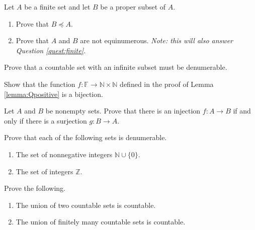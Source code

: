 \begin{exercise}\label{ex:finite}
Let $A$ be a finite set and let $B$ be a proper subset of $A$.
\begin{enumerate}
\item Prove that $B\preceq A$.
\item Prove that $A$ and $B$ are not equinumerous.  {\slshape Note: this will also answer Question \ref{quest:finite}.}
\end{enumerate}
\end{exercise}

\begin{exercise}\label{exer:countinf}\markit
Prove that a countable set with an infinite subset must be denumerable.
\end{exercise}

\begin{exercise}\label{exer:Qpositive}
Show that the function $f:\mathbb F\to \mathbb N\times\mathbb N$ defined in the proof of Lemma \ref{lemma:Qpositive} is a bijection.
\end{exercise}

\begin{exercise}\label{exer:injectsurject}
Let $A$ and $B$ be nonempty sets. Prove that there is an injection $f:A\to B$ if and only if there is a surjection $g:B\to A$.
\end{exercise}

\begin{exercise}\label{ex:count}
Prove that each of the following sets is denumerable.
\begin{enumerate}
\item The set of nonnegative integers $\mathbb N\cup\{0\}$.
\item The set of integers $\mathbb Z$.
\end{enumerate}
\end{exercise}

\begin{exercise}\label{ex:unioncount}
Prove the following.
\begin{enumerate}
\item The union of two countable sets is countable.
\item The union of finitely many countable sets is countable.
\end{enumerate}
\end{exercise}

